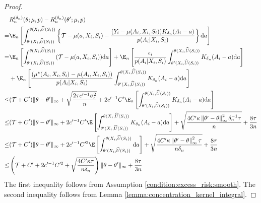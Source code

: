 \begin{proof}
\begin{align}
    & R_n^{({\delta_n})}(\theta;\mu,p) - R_n^{({\delta_n})}(\theta^\prime;\mu,p)\nonumber\\
    = & \E_n\left[\int_{\theta^\prime(X_i,\widehat U(S_i))}^{\theta(X_i,\widehat U(S_i))}\left\{\mathcal{T} -  \mu(a,X_i,S_i)- \frac{(Y_i - \mu(A_i,X_i,S_i))K_{\delta_n}(A_i-a)}{p(A_{i}|X_{i},S_{i})}\right\}\mathrm{d}a\right]\nonumber\\
    = & \E_n\left[\int_{\theta^\prime(X_i,\widehat U(S_i))}^{\theta(X_i,\widehat U(S_i))}(\mathcal{T} -  \mu(a,X_i,S_i))\mathrm{d}a\right]+\E_n\left[\frac{\epsilon_i}{p(A_{i}|X_{i},S_{i})}\int_{\theta^\prime(X_i,\widehat U(S_i))}^{\theta(X_i,\widehat U(S_i))}K_{\delta_n}(A_i-a)\mathrm{d}a\right]\nonumber\\
    & + \E_n\left[\frac{(\mu^*(A_i,X_i,S_i) - \mu(A_i,X_i,S_i))}{p(A_{i}|X_{i},S_{i})}\int_{\theta^\prime(X_i,\widehat U(S_i))}^{\theta(X_i,\widehat U(S_i))}K_{\delta_n}(A_i-a)\mathrm{d}a\right] \nonumber\\
    \leq & (\mathcal{T}+C^\prime)\|\theta-\theta^\prime\|_{\infty} +\sqrt{\frac{2\tau c^{\prime-1} \sigma_\epsilon^2}{n}}+ 2c^{\prime-1}C^{\prime} \E_n\left[\int_{\theta^\prime(X_i,\widehat U(S_i))}^{\theta(X_i,\widehat U(S_i))}K_{\delta_n}(A_i-a)\mathrm{d}a\right]\nonumber\\
    \leq & (\mathcal{T}+C^\prime)\|\theta-\theta^\prime\|_{\infty} + 2c^{\prime-1}C^{\prime} \E\left[\int_{\theta^\prime(X_i,\widehat U(S_i))}^{\theta(X_i,\widehat U(S_i))}K_{\delta_n}(A_i-a)\mathrm{d}a\right] + \sqrt{\frac{4C^\prime \kappa \left\|\theta^\prime - \theta\right\|^2_\infty  \delta_n^{-1}\tau}{n}} + \frac{8\tau}{3n}\nonumber\\
    \leq & (\mathcal{T}+C^\prime)\|\theta-\theta^\prime\|_{\infty} + 2c^{\prime-1}C^{\prime2} \E\left[\int_{\theta^\prime(X_i,\widehat U(S_i))}^{\theta(X_i,\widehat U(S_i))}\mathrm{d}a\right]+\sqrt{\frac{4C^\prime \kappa \left\|\theta^\prime - \theta\right\|^2_\infty \tau}{n\delta_n}} + \frac{8\tau}{3n}\nonumber\\
    \leq & \left(\mathcal{T}+C^\prime+2c^{\prime-1}C^{\prime2}+\sqrt{\frac{4C^\prime \kappa \tau}{n\delta_n}}\right)\|\theta-\theta^\prime\|_{\infty} + \frac{8\tau}{3n}\label{eq:lipschitz_to_theta_E}
\end{align}
The first inequality follows from Assumption \ref{condition:excess_risk:smooth}. The second inequality follows from Lemma \ref{lemma:concentration_kernel_integral}.
\end{proof}

